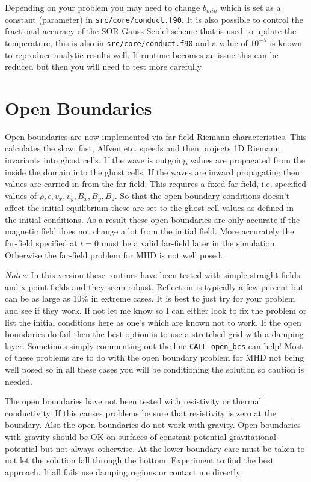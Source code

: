 \documentclass[11pt]{article}
\begin{document}
Depending on your problem you may need to change $b_{min}$ which is set as a constant (parameter) in {\tt src/core/conduct.f90}. It is also possible to control the fractional accuracy of the SOR Gauss-Seidel scheme that is used to update the temperature, this is also in {\tt src/core/conduct.f90} and a value of $10^{-5}$ is known to reproduce analytic results well. If runtime becomes an issue this can be reduced but then you will need to test more carefully.


\section{Open  Boundaries} %
\label{sec:open_bcs}
Open boundaries are now implemented via far-field Riemann characteristics. This calculates the slow, fast, Alfven etc. speeds and then projects 1D Riemann invariants into ghost cells. If the wave is outgoing values are propagated from the inside the domain into the ghost cells. If the waves are inward propagating then values are carried in from the far-field. This requires a fixed far-field, i.e. specified values of $\rho, \epsilon, v_x, v_y, B_x, B_y, B_z$. So that the open boundary conditions doesn't affect the initial equilibrium these are set to the ghost cell values as defined in the initial conditions. As a result these open boundaries are only accurate if the magnetic field does not change a lot from the initial field. More accurately the far-field specified at $t=0$ must be a valid far-field later in the simulation. Otherwise the far-field problem for MHD is not well posed.

{\it Notes:} In this version these routines have been tested with simple straight fields and x-point fields and they seem robust. Reflection is typically a few percent but can be as large as 10\% in extreme cases. It is best to just try for your problem and see if they work. If not let me know so I can either look to fix the problem or list the initial conditions here as one's which are known not to work. If the open boundaries do fail then the best option is to use a stretched grid with a damping layer. Sometimes simply commenting out the line {\tt CALL open\_bcs} can help! Most of these problems are to do with the open boundary problem for MHD not being well posed so in all these cases you will be conditioning the solution so caution is needed.

The open boundaries have not been tested with resistivity or thermal conductivity. If this causes problems be sure that resistivity is zero at the boundary. Also the open boundaries do not work with gravity. Open boundaries with gravity should be OK on surfaces of constant potential gravitational potential but not always otherwise. At the lower boundary care must be taken to not let the solution fall through the bottom. Experiment to find the best approach. If all fails use damping regions or contact me directly.
\end{document}
